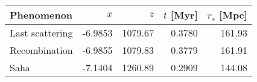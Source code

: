 \begin{tabular}{l|rrrr}
\hline
Phenomenon & $x$ & $z$ & $t$ [Myr] & $r_s$ [Mpc] \\
\hline
Last scattering   & -6.9853 & 1079.67 & 0.3780 & 161.93 \\
Recombination     & -6.9855 & 1079.83 & 0.3779 & 161.91 \\
Saha              & -7.1404 & 1260.89 & 0.2909 & 144.08 \\
\hline
\hline
\end{tabular}
